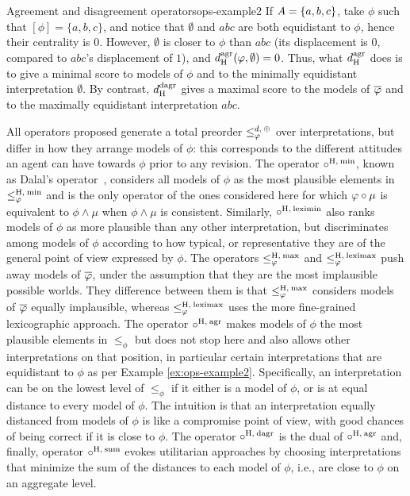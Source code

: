 \begin{xmpl}{Agreement and disagreement operators}{ops-example2}
	If $A=\{a,b,c\}$,
	take $\phi$ such that $[\phi]=\{a,b,c\}$,
	and notice that $\emptyset$ and $abc$ 
	are both equidistant to $\phi$,
	hence their centrality is $0$.
	However, $\emptyset$ is closer to $\phi$ than $abc$
	(its displacement is $0$, compared to $abc$'s displacement of $1$),
	and $d_{\operatorname{H}}^{\mathrm{agr}}(\varphi,\emptyset)=0$.
	Thus, what $d_{\operatorname{H}}^{\mathrm{agr}}$ does is to give
	a minimal score to models of $\phi$ and to the minimally equidistant
	interpretation $\emptyset$.
	By contrast, $d_{\operatorname{H}}^{\mathrm{dagr}}$ gives a maximal score
	to the models of $\overline{\varphi}$ and to the maximally equidistant 
	interpretation $abc$.
\end{xmpl}

All operators proposed generate a total preorder 
$\le^{d,\:{\operatorname{\oplus}}}_\varphi$ over interpretations, 
but differ in how they arrange 
models of $\phi$:
this corresponds to the different attitudes an agent can have towards
$\phi$ prior to any revision.
The operator $\circ^{{\operatorname{H}},\:{\operatorname{min}}}$,
known as Dalal's operator~\cite{Dalal88},
considers all models of $\phi$
as the most plausible elements in $\le_\varphi^{{\operatorname{H}},\:{\operatorname{min}}}$
and is the only operator of the ones considered here
for which $\varphi\circ\mu$ is equivalent to $\phi\land\mu$
when $\phi\land\mu$ is consistent.
Similarly, $\circ^{{\operatorname{H}},\:{\operatorname{leximin}}}$ %
also ranks models of $\phi$ as more plausible than any other interpretation,
but discriminates among models of $\phi$
according to how typical, or representative they are 
of the general point of view expressed by $\phi$.
The operators 
$\le_\varphi^{{\operatorname{H}},\:{\operatorname{max}}}$
and $\le_\varphi^{{\operatorname{H}},\:{\operatorname{leximax}}}$
push away models of $\overline{\varphi}$,
under the assumption that they are the most implausible possible worlds.
They difference between them is that $\le_\varphi^{{\operatorname{H}},\:{\operatorname{max}}}$ considers models of $\overline{\varphi}$ equally implausible,
whereas $\le_\varphi^{{\operatorname{H}},\:{\operatorname{leximax}}}$ uses the more fine-grained lexicographic approach.
The operator $\circ^{{\operatorname{H}},\:\mathrm{agr}}$ 
makes models of $\phi$ the most plausible elements in $\le_\phi$ but 
does not stop here and 
also allows other interpretations on that position,
in particular certain interpretations that are equidistant to $\phi$
as per Example \ref{ex:ops-example2}.
Specifically, an interpretation can be on the lowest level of $\le_\phi$
if it either is a model of $\phi$, or is at equal distance to every model of $\phi$.
The intuition is that an interpretation equally distanced from models of $\phi$ is 
like a compromise point of view, 
with good chances of being correct if it is close to $\phi$.
The operator $\circ^{{\operatorname{H}},\:\mathrm{dagr}}$ is the dual of 
$\circ^{{\operatorname{H}},\:\mathrm{agr}}$ and,
finally, operator $\circ^{{\operatorname{H}},\:{\operatorname{sum}}}$ evokes
utilitarian approaches
by choosing interpretations
that minimize the sum of the distances to each model of $\phi$,
i.e., are close to $\phi$ on an aggregate level.

